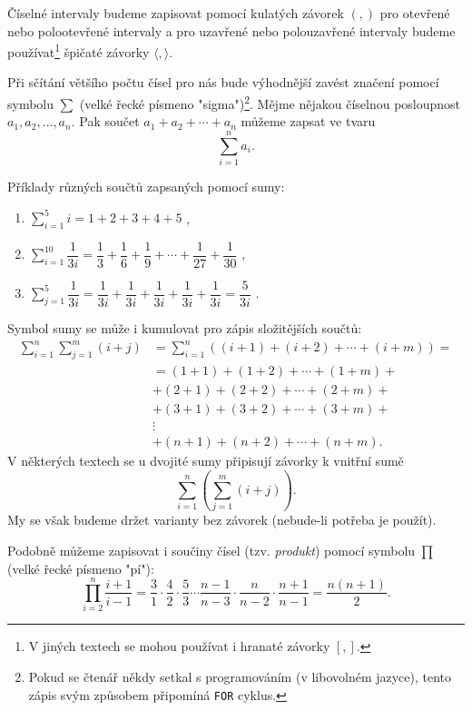 Číselné intervaly budeme zapisovat pomocí kulatých závorek $(,)$ pro otevřené nebo polootevřené intervaly a pro uzavřené nebo polouzavřené intervaly budeme používat\footnote{V jiných textech se mohou používat i hranaté závorky $[,]$.} špičaté závorky $\langle,\rangle$.\par
\medskip
Při sčítání většího počtu čísel pro nás bude výhodnější zavést značení pomocí symbolu $\sum$ (velké řecké písmeno "sigma")\footnote{Pokud se čtenář někdy setkal s programováním (v libovolném jazyce), tento zápis svým způsobem připomíná \texttt{FOR} cyklus.}. Mějme nějakou číselnou posloupnost $a_1,a_2,\dots,a_n$. Pak součet $a_1+a_2+\cdots+a_n$ můžeme zapsat ve tvaru
\begin{equation*}
    \sum_{i=1}^{n}{a_i}.
\end{equation*}
\begin{example}\label{ex:uziti_sum}
    Příklady různých součtů zapsaných pomocí sumy:
    \begin{enumerate}[label=(\roman*)]
        \item $\displaystyle \sum_{i=1}^{5}{i}=1+2+3+4+5$ ,
        \item $\displaystyle \sum_{i=1}^{10}{\dfrac{1}{3i}}=\dfrac{1}{3}+\dfrac{1}{6}+\dfrac{1}{9}+\cdots+\dfrac{1}{27}+\dfrac{1}{30}$ ,
        \item $\displaystyle \sum_{j=1}^{5}{\dfrac{1}{3i}}=\dfrac{1}{3i}+\dfrac{1}{3i}+\dfrac{1}{3i}+\dfrac{1}{3i}+\dfrac{1}{3i}=\dfrac{5}{3i}$ .
    \end{enumerate}
\end{example}
Symbol sumy se může i kumulovat pro zápis složitějších součtů:
\begin{align*}
    \sum_{i=1}^{n}{\sum_{j=1}^{m}{(i+j)}}&=\sum_{i=1}^{n}{\left((i+1)+(i+2)+\cdots+(i+m)\right)}=\\
    &=(1+1)+(1+2)+\cdots+(1+m)+\\
    &+(2+1)+(2+2)+\cdots+(2+m)+\\
    &+(3+1)+(3+2)+\cdots+(3+m)+\\
    &\vdots\\
    &+(n+1)+(n+2)+\cdots+(n+m).
\end{align*}
V některých textech se u dvojité sumy připisují závorky k vnitřní sumě
\begin{equation*}
    \sum_{i=1}^{n}{\left(\sum_{j=1}^{m}{(i+j)}\right)}.
\end{equation*}
My se však budeme držet varianty bez závorek (nebude-li potřeba je použít).\par
Podobně můžeme zapisovat i součiny čísel (tzv. \emph{produkt}) pomocí symbolu $\prod$ (velké řecké písmeno "pí"):
\begin{equation*}
    \prod_{i=2}^{n}{\dfrac{i+1}{i-1}}=\dfrac{3}{1}\cdot\dfrac{4}{2}\cdot\dfrac{5}{3}\cdots\dfrac{n-1}{n-3}\cdot\dfrac{n}{n-2}\cdot\dfrac{n+1}{n-1}=\dfrac{n(n+1)}{2}.
\end{equation*}

